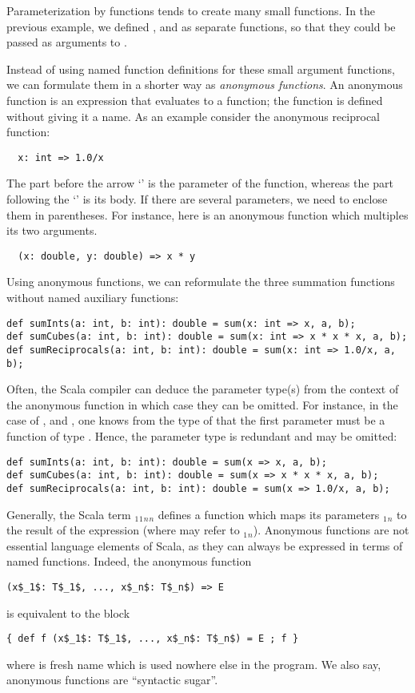 Parameterization by functions tends to create many small functions. In
the previous example, we defined ,  and
 as separate functions, so that they could be 
passed as arguments to .

Instead of using named function definitions for these small argument
functions, we can formulate them in a shorter way as {\em anonymous
functions}. An anonymous function is an expression that evaluates to a
function; the function is defined without giving it a name. As an
example consider the anonymous reciprocal function:
\begin{lstlisting}
  x: int => 1.0/x
\end{lstlisting}
The part before the arrow `\code{=>}' is the parameter of the function,
whereas the part following the `\code{=>}' is its body. If there are
several parameters, we need to enclose them in parentheses. For
instance, here is an anonymous function which multiples its two arguments.
\begin{lstlisting}
  (x: double, y: double) => x * y
\end{lstlisting}
Using anonymous functions, we can reformulate the three summation
functions without named auxiliary functions:
\begin{lstlisting}
def sumInts(a: int, b: int): double = sum(x: int => x, a, b);
def sumCubes(a: int, b: int): double = sum(x: int => x * x * x, a, b);
def sumReciprocals(a: int, b: int): double = sum(x: int => 1.0/x, a, b);
\end{lstlisting}
Often, the Scala compiler can deduce the parameter type(s) from the
context of the anonymous function in which case they can be omitted.
For instance, in the case of ,  and
, one knows from the type of
 that the first parameter must be a function of type
.  Hence, the parameter type  is
redundant and may be omitted:
\begin{lstlisting}
def sumInts(a: int, b: int): double = sum(x => x, a, b);
def sumCubes(a: int, b: int): double = sum(x => x * x * x, a, b);
def sumReciprocals(a: int, b: int): double = sum(x => 1.0/x, a, b);
\end{lstlisting}

Generally, the Scala term
$_1$$_1$$_n$$_n$ 
defines a function which maps its parameters
$_1$$_n$ to the result of the expression 
(where  may refer to $_1$$_n$).  Anonymous
functions are not essential language elements of Scala, as they can
always be expressed in terms of named functions. Indeed, the 
anonymous function
\begin{lstlisting}
(x$_1$: T$_1$, ..., x$_n$: T$_n$) => E
\end{lstlisting}
is equivalent to the block
\begin{lstlisting}
{ def f (x$_1$: T$_1$, ..., x$_n$: T$_n$) = E ; f }
\end{lstlisting}
where  is fresh name which is used nowhere else in the program.
We also say, anonymous functions are ``syntactic sugar''.

